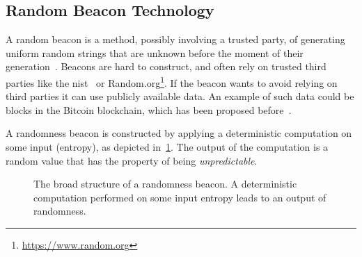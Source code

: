 \subsection{Random Beacon Technology}
A random beacon is a method, possibly involving a trusted party, of generating uniform random strings that are unknown before the moment of their generation~\cite{andrychowicz2014distributed}.
Beacons are hard to construct, and often rely on trusted third parties like the \acrfull{nist}~\cite{nistbeacon} or Random.org\footnote{\url{https://www.random.org}}.
If the beacon wants to avoid relying on third parties it can use publicly available data.
An example of such data could be blocks in the Bitcoin blockchain, which has been proposed before~\cite{bonneau2015bitcoin}.

A randomness beacon is constructed by applying a deterministic computation on some input (entropy), as depicted in~\cref{fig:beacon}. The output of the computation is a random value that has the property of being \emph{unpredictable}. 

\begin{figure}[htb]
    \centering
    \caption{The broad structure of a randomness beacon. A deterministic computation performed on some input entropy leads to an output of randomness.}
    \label{fig:beacon}
\end{figure}
